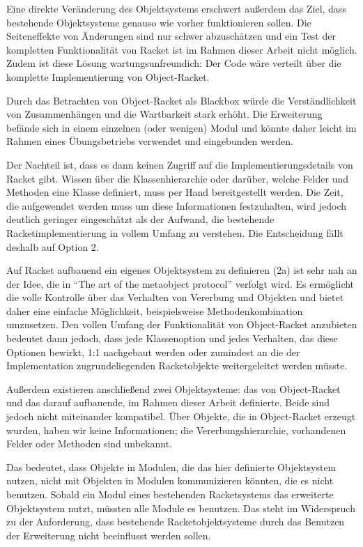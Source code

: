Eine direkte Veränderung des Objektsystems erschwert außerdem das Ziel, dass bestehende Objektsysteme genauso wie vorher funktionieren sollen. Die Seiteneffekte von Änderungen sind nur schwer abzuschätzen und ein Test der kompletten Funktionalität von Racket ist im Rahmen dieser Arbeit nicht möglich. Zudem ist diese Lösung wartungsunfreundich: Der Code wäre verteilt über die komplette Implementierung von Object-Racket. 

Durch das Betrachten von Object-Racket als Blackbox würde die Verständlichkeit von Zusammenhängen und die Wartbarkeit stark erhöht. Die Erweiterung befände sich in einem einzelnen (oder wenigen) Modul und könnte daher leicht im Rahmen eines Übungsbetriebs verwendet und eingebunden werden.

Der Nachteil ist, dass es dann keinen Zugriff auf die Implementierungsdetails von Racket gibt. Wissen über die Klassenhierarchie oder darüber, welche Felder und Methoden eine Klasse definiert, muss per Hand bereitgestellt werden. Die Zeit, die aufgewendet werden muss um diese Informationen festzuhalten, wird jedoch deutlich geringer eingeschätzt als der Aufwand, die bestehende Racketimplementierung in vollem Umfang zu verstehen. Die Entscheidung fällt deshalb auf Option 2.

Auf Racket aufbauend ein eigenes Objektsystem zu definieren (2a) ist sehr nah an der Idee, die in ``The art of the metaobject protocol'' \cite{amop} verfolgt wird. Es ermöglicht die volle Kontrolle über das Verhalten von Vererbung und Objekten und bietet daher eine einfache Möglichkeit, beispielsweise Methodenkombination umzusetzen. Den vollen Umfang der Funktionalität von Object-Racket anzubieten bedeutet dann jedoch, dass jede Klassenoption und jedes Verhalten, das diese Optionen bewirkt, 1:1 nachgebaut werden oder zumindest an die der Implementation zugrundeliegenden Racketobjekte weitergeleitet werden müsste.

Außerdem existieren anschließend zwei Objektsysteme: das von Object-Racket und das darauf aufbauende, im Rahmen dieser Arbeit definierte. Beide sind jedoch nicht miteinander kompatibel. Über Objekte, die in Object-Racket erzeugt wurden, haben wir keine Informationen; die Vererbungshierarchie, vorhandenen Felder oder Methoden sind unbekannt. 

Das bedeutet, dass Objekte in Modulen, die das hier definierte Objektsystem nutzen, nicht mit Objekten in Modulen kommunizieren könnten, die es nicht benutzen. Sobald ein Modul eines bestehenden Racketsystems das erweiterte Objektsystem nutzt, müssten alle Module es benutzen. Das steht im Widerspruch zu der Anforderung, dass bestehende Racketobjektsysteme durch das Benutzen der Erweiterung nicht beeinflusst werden sollen.

